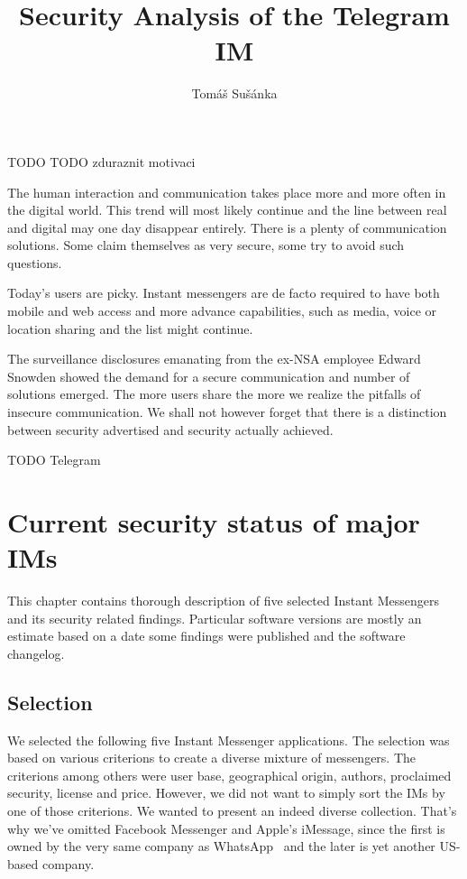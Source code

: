 \documentclass[thesis=M,english]{FITthesis}[2012/10/20]
\title{Security Analysis of the Telegram IM}
\author{Tom{\' a}{\v s} Su{\v s}{\' a}nka} %
\begin{document}

\begin{introduction}

TODO TODO zduraznit motivaci

The human interaction and communication takes place more and more often in the digital world. This trend will most likely continue and the line between real and digital may one day disappear entirely. There is a plenty of communication solutions. Some claim themselves as very secure, some try to avoid such questions.

Today's users are picky. Instant messengers are de facto required to have both mobile and web access and more advance capabilities, such as media, voice or location sharing and the list might continue.

The surveillance disclosures emanating from the ex-NSA employee Edward Snowden showed the demand for a secure communication and number of solutions emerged. The more users share the more we realize the pitfalls of insecure communication. We shall not however forget that there is a distinction between security advertised and security actually achieved.

TODO Telegram

\end{introduction}



\chapter{Current security status of major IMs}\label{compar}

This chapter contains thorough description of five selected Instant Messengers and its security related findings. Particular software versions are mostly an estimate based on a date some findings were published and the software changelog.

\section{Selection}

We selected the following five Instant Messenger applications. The selection was based on various criterions to create a diverse mixture of messengers. The criterions among others were user base, geographical origin, authors, proclaimed security, license and price. However, we did not want to simply sort the IMs by one of those criterions. We wanted to present an indeed diverse collection. That's why we've omitted Facebook Messenger and Apple's iMessage, since the first is owned by the very same company as WhatsApp~\cite{facebookwhatsappbuy} and the later is yet another US-based company.
\end{document}
